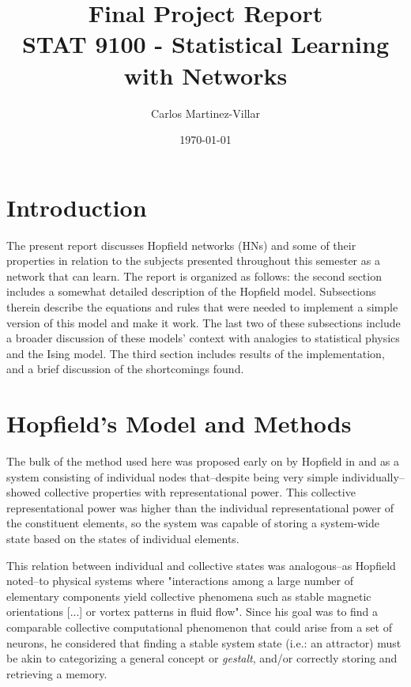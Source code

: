 \documentclass[11pt]{article}
\title{Final Project Report\\STAT 9100 - Statistical Learning with Networks}
\author{Carlos Martinez-Villar}
\date{\today}
\begin{document}
	\section{Introduction}
	The present report discusses Hopfield networks (HNs) and some of their properties in relation to the subjects presented throughout this semester as a network that can learn.
	The report is organized as follows: the second section includes a somewhat detailed description of the Hopfield model. 
	Subsections therein describe the equations and rules that were needed to implement a simple version of this model and make it work.
	The last two of these subsections include a broader discussion of these models' context with analogies to statistical physics and the Ising model. 
	The third section includes results of the implementation, and a brief discussion of the shortcomings found. 
	

	\section{Hopfield's Model and Methods}
	
	The bulk of the method used here was proposed early on by Hopfield in \cite{hopfield1982neural}  and \cite{hopfield1984neurons} as a system consisting of individual nodes that–despite being very simple individually–showed collective properties with representational power. This collective representational power was higher than the individual representational power of the constituent elements, so the system was capable of storing a system-wide state based on the states of individual elements. 
	
	This relation between individual and collective states was analogous–as Hopfield noted–to physical systems where "interactions among a large number of elementary components yield collective phenomena such as stable magnetic orientations [...] or vortex patterns in fluid flow". Since his goal was to find a comparable collective computational phenomenon that could arise from a set of neurons, he considered that finding a stable system state (i.e.: an attractor) must be akin to categorizing a general concept or \textit{gestalt}, and/or correctly storing and retrieving a memory.
	
\end{document}
